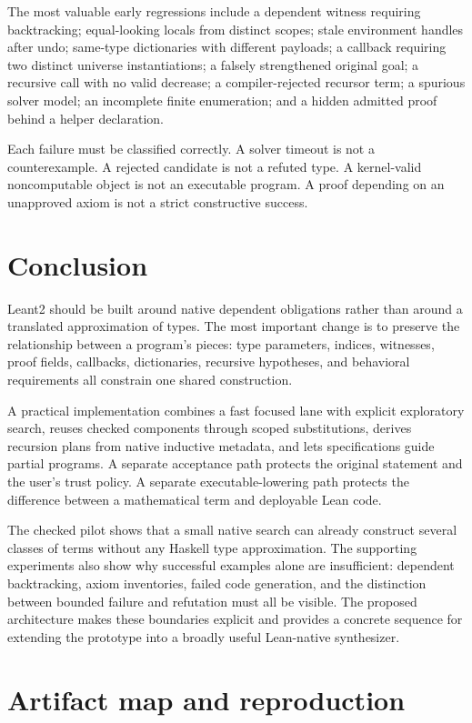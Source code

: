 \documentclass[11pt,a4paper]{article}
\theoremstyle{remark}
\begin{document}
The most valuable early regressions include a dependent witness requiring backtracking; equal-looking locals from distinct scopes; stale environment handles after undo; same-type dictionaries with different payloads; a callback requiring two distinct universe instantiations; a falsely strengthened original goal; a recursive call with no valid decrease; a compiler-rejected recursor term; a spurious solver model; an incomplete finite enumeration; and a hidden admitted proof behind a helper declaration.

Each failure must be classified correctly. A solver timeout is not a counterexample. A rejected candidate is not a refuted type. A kernel-valid noncomputable object is not an executable program. A proof depending on an unapproved axiom is not a strict constructive success.

\section{Conclusion}

Leant2 should be built around native dependent obligations rather than around a translated approximation of types. The most important change is to preserve the relationship between a program's pieces: type parameters, indices, witnesses, proof fields, callbacks, dictionaries, recursive hypotheses, and behavioral requirements all constrain one shared construction.

A practical implementation combines a fast focused lane with explicit exploratory search, reuses checked components through scoped substitutions, derives recursion plans from native inductive metadata, and lets specifications guide partial programs. A separate acceptance path protects the original statement and the user's trust policy. A separate executable-lowering path protects the difference between a mathematical term and deployable Lean code.

The checked pilot shows that a small native search can already construct several classes of terms without any Haskell type approximation. The supporting experiments also show why successful examples alone are insufficient: dependent backtracking, axiom inventories, failed code generation, and the distinction between bounded failure and refutation must all be visible. The proposed architecture makes these boundaries explicit and provides a concrete sequence for extending the prototype into a broadly useful Lean-native synthesizer.

\appendix
\section{Artifact map and reproduction}\label{app:artifacts}
\end{document}
